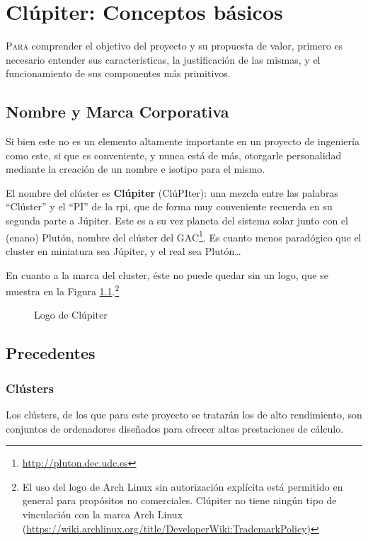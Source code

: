 \chapter{Clúpiter: Conceptos básicos}
\label{chap:conceptos_basicos}

\lettrine{P}{ara} comprender el objetivo del proyecto y su propuesta de valor, primero es necesario entender sus características, la justificación de las mismas, y el funcionamiento de sus componentes más primitivos.

\section{Nombre y Marca Corporativa}
Si bien este no es un elemento altamente importante en un proyecto de ingeniería como este, si que es conveniente, y nunca está de más, otorgarle personalidad mediante la creación de un nombre e isotipo para el mismo.

El nombre del clúster es \textbf{Clúpiter} (ClúPIter): una mezcla entre las palabras ``Clúster'' y el ``PI'' de la \acrlong{rpi}, que de forma muy conveniente recuerda en su segunda parte a Júpiter. Este es a su vez planeta del sistema solar junto con el (enano) Plutón, nombre del clúster del GAC\footnote{\url{http://pluton.dec.udc.es}}. Es cuanto menos paradógico que el cluster en miniatura sea Júpiter, y el real sea Plutón\dots

En cuanto a la marca del cluster, éste no puede quedar sin un logo, que se muestra en la Figura \ref{fig:clupiter_logo}.\footnote{El uso del logo de Arch Linux sin autorización explícita está permitido en general para propósitos no comerciales. Clúpiter no tiene ningún tipo de vinculación con la marca Arch Linux (\url{https://wiki.archlinux.org/title/DeveloperWiki:TrademarkPolicy})}

\begin{figure}[h!]
  \centering
  \vspace*{0.5cm}
  \def\svgwidth{0.50\textwidth}
  
  \caption{Logo de Clúpiter}
  \label{fig:clupiter_logo}
\end{figure}

\section{Precedentes}
\subsection{Clústers}
Los clústers, de los que para este proyecto se tratarán los de alto rendimiento, son conjuntos de ordenadores diseñados para ofrecer altas prestaciones de cálculo.

